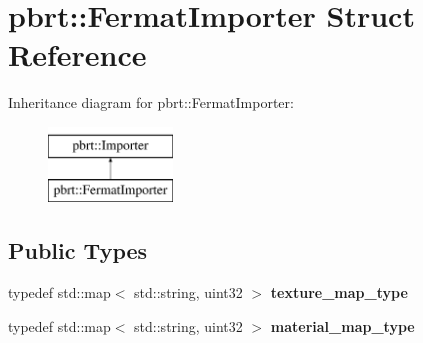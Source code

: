 \hypertarget{structpbrt_1_1_fermat_importer}{}\section{pbrt\+:\+:Fermat\+Importer Struct Reference}
\label{structpbrt_1_1_fermat_importer}
Inheritance diagram for pbrt\+:\+:Fermat\+Importer\+:\begin{figure}[H]
\begin{center}
\leavevmode
\includegraphics[height=2.000000cm]{structpbrt_1_1_fermat_importer}
\end{center}
\end{figure}
\subsection*{Public Types}
\begin{DoxyCompactItemize}
\item 
\mbox{\label{structpbrt_1_1_fermat_importer_acdbdff3f7886caf8adf31379cd91a03e}} 
typedef std\+::map$<$ std\+::string, uint32 $>$ {\bfseries texture\+\_\+map\+\_\+type}
\item 
\mbox{\label{structpbrt_1_1_fermat_importer_a4d69b9003deaf92200f5e44fe625fe59}} 
typedef std\+::map$<$ std\+::string, uint32 $>$ {\bfseries material\+\_\+map\+\_\+type}
\end{DoxyCompactItemize}
